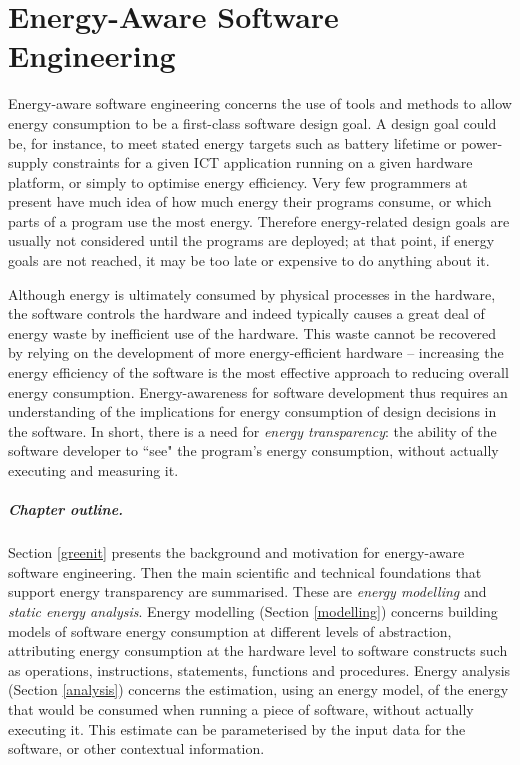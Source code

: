 \documentclass[11pt,oneside]{book}
\begin{document}
\chapter{Energy-Aware Software Engineering}

Energy-aware software engineering concerns the use of tools and methods to allow energy consumption to be a first-class software design goal. A design goal could be, for instance, to meet stated energy targets such as battery lifetime or power-supply constraints for a given ICT application running on a given hardware platform, or simply to optimise energy efficiency. Very few programmers at present have much idea of how much energy their programs consume, or which parts of a program use the most energy. Therefore energy-related design goals are usually not considered until the programs are deployed; at that point, if energy goals are not reached, it may be too late or expensive to do anything about it.


Although energy is ultimately consumed by physical processes in the hardware, the software controls the hardware and indeed typically causes a great deal of energy waste by inefficient use of the hardware. This waste cannot be recovered by relying on the development of more energy-efficient hardware -- increasing the energy efficiency of the software is the most effective approach to reducing overall energy consumption. Energy-awareness for software development thus requires an understanding of the implications for energy consumption of design decisions in the software. In short, there is a need for \emph{energy transparency}: the ability of the software developer to ``see" the program's energy consumption, without actually executing and measuring it.

\paragraph{Chapter outline.}  Section \ref{greenit} presents the background and motivation for energy-aware software engineering. Then  the main scientific and technical foundations that support energy transparency are summarised.  These are \emph{energy modelling} and \emph{static energy analysis}. Energy modelling (Section \ref{modelling}) concerns building models of software energy consumption at different levels of abstraction, attributing energy consumption at the hardware level to software constructs such as operations, instructions, statements, functions and
procedures.   Energy analysis (Section \ref{analysis}) concerns the estimation, using an energy model, of the energy that would be consumed when running a piece of software, without actually executing it.  This estimate can be parameterised by the input data for the software, or other contextual information. 
\end{document}
